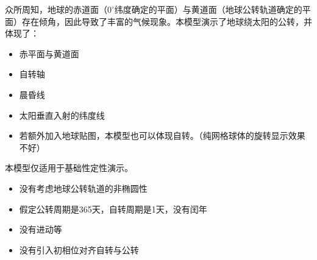 
众所周知，地球的赤道面（$0 ^\circ$纬度确定的平面）与黄道面（地球公转轨道确定的平面）存在倾角，因此导致了丰富的气候现象。本模型演示了地球绕太阳的公转，并体现了：
\begin{itemize}
\item 赤平面与黄道面
\item 自转轴
\item 晨昏线
\item 太阳垂直入射的纬度线
\item 若额外加入地球贴图，本模型也可以体现自转。（纯网格球体的旋转显示效果不好）
\end{itemize}

本模型仅适用于基础性定性演示。
\begin{itemize}
\item 没有考虑地球公转轨道的非椭圆性
\item 假定公转周期是365天，自转周期是1天，没有闰年
\item 没有进动等
\item 没有引入初相位对齐自转与公转
\end{itemize}

